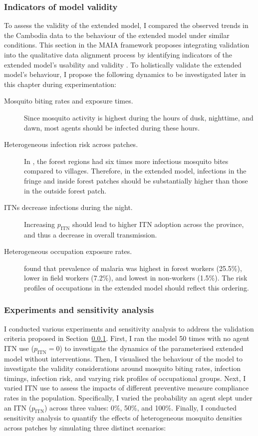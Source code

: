 \subsubsection{Indicators of model validity}\label{maiasec:questions}

To assess the validity of the extended model, I compared the observed trends in the Cambodia data to the behaviour of the extended model under similar conditions. This section in the MAIA framework proposes integrating validation into the qualitative data alignment process by identifying indicators of the extended model's usability and validity \cite{ghorbani_maia_2013}. To holistically validate the extended model's behaviour, I propose the following dynamics to be investigated later in this chapter during experimentation:

\begin{description}
    \item[Mosquito biting rates and exposure times.] Since mosquito activity is highest during the hours of dusk, nighttime, and dawn, most agents should be infected during these hours.
    \item[Heterogeneous infection risk across patches.] In \citet{vantaux_anopheles_2021}, the forest regions had six times more infectious mosquito bites compared to villages. Therefore, in the extended model, infections in the fringe and inside forest patches should be substantially higher than those in the outside forest patch.
    \item[ITNs decrease infections during the night.] Increasing $p_{\text{ITN}}$ should lead to higher ITN adoption across the province, and thus a decrease in overall transmission.
    \item[Heterogeneous occupation exposure rates.] \citet{sandfort_forest_2020} found that prevalence of malaria was highest in forest workers (25.5\%), lower in field workers (7.2\%), and lowest in non-workers (1.5\%). The risk profiles of occupations in the extended model should reflect this ordering.
\end{description}

\subsubsection{Experiments and sensitivity analysis}

I conducted various experiments and sensitivity analysis to address the validation criteria proposed in Section~\ref{maiasec:questions}. First, I ran the model 50 times with no agent ITN use ($p_{\text{ITN}}=0$) to investigate the dynamics of the parameterised extended model without interventions. Then, I visualised the behaviour of the model to investigate the validity considerations around mosquito biting rates, infection timings, infection risk, and varying risk profiles of occupational groups. Next, I varied ITN use to assess the impacts of different preventive measure compliance rates in the population. Specifically, I varied the probability an agent slept under an ITN ($p_{\text{ITN}}$) across three values: 0\%, 50\%, and 100\%. Finally, I conducted sensitivity analysis to quantify the effects of heterogeneous mosquito densities across patches by simulating three distinct scenarios:

